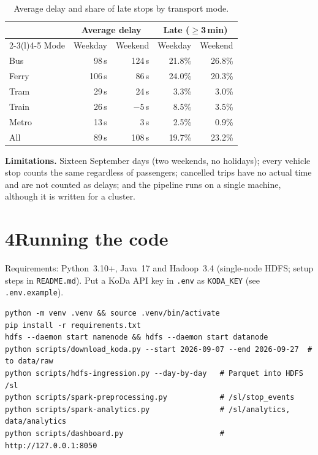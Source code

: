 \documentclass[10pt,a4paper]{article}
\begin{document}
\begin{table}[h]
\centering\small
\caption{Average delay and share of late stops by transport mode.}
\label{tab:days}
\begin{tabular}{@{}lrrrr@{}}
\toprule
 & \multicolumn{2}{c}{Average delay} & \multicolumn{2}{c}{Late ($\geq$3\,min)}\\
\cmidrule(lr){2-3}\cmidrule(l){4-5}
Mode & Weekday & Weekend & Weekday & Weekend \\
\midrule
Bus   & 98\,s & 124\,s & 21.8\% & 26.8\% \\
Ferry & 106\,s & 86\,s & 24.0\% & 20.3\% \\
Tram  & 29\,s & 24\,s & 3.3\% & 3.0\% \\
Train & 26\,s & $-5$\,s & 8.5\% & 3.5\% \\
Metro & 13\,s & 3\,s & 2.5\% & 0.9\% \\
\midrule
All   & 89\,s & 108\,s & 19.7\% & 23.2\% \\
\bottomrule
\end{tabular}
\vspace{-4pt}
\end{table}

\textbf{Limitations.} Sixteen September days (two weekends, no holidays); every vehicle stop counts the
same regardless of passengers; cancelled trips have no actual time and are not counted as delays; and the
pipeline runs on a single machine, although it is written for a cluster.

\section*{4\quad Running the code}
Requirements: Python~3.10+, Java~17 and Hadoop~3.4 (single-node HDFS; setup steps in
\texttt{README.md}). Put a KoDa API key in \texttt{.env} as \texttt{KODA\_KEY} (see \texttt{.env.example}).
\begin{verbatim}
python -m venv .venv && source .venv/bin/activate
pip install -r requirements.txt
hdfs --daemon start namenode && hdfs --daemon start datanode
python scripts/download_koda.py --start 2026-09-07 --end 2026-09-27  # to data/raw
python scripts/hdfs-ingression.py --day-by-day   # Parquet into HDFS /sl
python scripts/spark-preprocessing.py            # /sl/stop_events
python scripts/spark-analytics.py                # /sl/analytics, data/analytics
python scripts/dashboard.py                      # http://127.0.0.1:8050
\end{verbatim}
\end{document}
